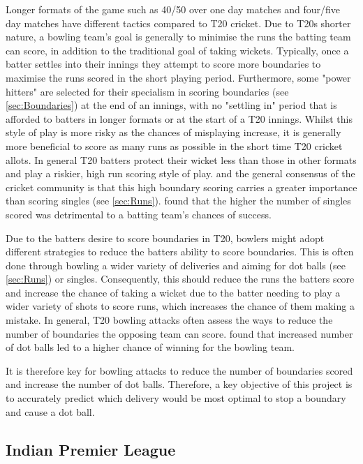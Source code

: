 \documentclass[12pt,a4paper]{report}
\theoremstyle{definition}
\begin{document}
Longer formats of the game such as 40/50 over one day matches and four/five day matches have different tactics compared to T20 cricket.
Due to T20s shorter nature, a bowling team's goal is generally to minimise the runs the batting team can score, in addition to the traditional goal of taking wickets.
Typically, once a batter settles into their innings they attempt to score more boundaries to maximise the runs scored in the short playing period.
Furthermore, some "power hitters" are selected for their specialism in scoring boundaries (see \ref{sec:Boundaries}) at the end of an innings, with no "settling in" period that is afforded to batters in longer formats or at the start of a T20 innings.
Whilst this style of play is more risky as the chances of misplaying increase, it is generally more beneficial to score as many runs as possible in the short time T20 cricket allots.
In general T20 batters protect their wicket less than those in other formats and play a riskier, high run scoring style of play.
\citet{Irvine2017} and the general consensus of the cricket community is that this high boundary scoring carries a greater importance than scoring singles (see \ref{sec:Runs}). 
\citet{Irvine2017} found that the higher the number of singles scored was detrimental to a batting team's chances of success.

Due to the batters desire to score boundaries in T20, bowlers might adopt different strategies to reduce the batters ability to score boundaries. 
This is often done through bowling a wider variety of deliveries and aiming for dot balls (see \ref{sec:Runs}) or singles.
Consequently, this should reduce the runs the batters score and increase the chance of taking a wicket due to the batter needing to play a wider variety of shots to score runs, which increases the chance of them making a mistake.
In general, T20 bowling attacks often assess the ways to reduce the number of boundaries the opposing team can score.
\citet{Irvine2017} found that increased number of dot balls led to a higher chance of winning for the bowling team. 

It is therefore key for bowling attacks to reduce the number of boundaries scored and increase the number of dot balls.
Therefore, a key objective of this project is to accurately predict which delivery would be most optimal to stop a boundary and cause a dot ball.

\subsection{Indian Premier League} \label{sec:IPL}
\end{document}
